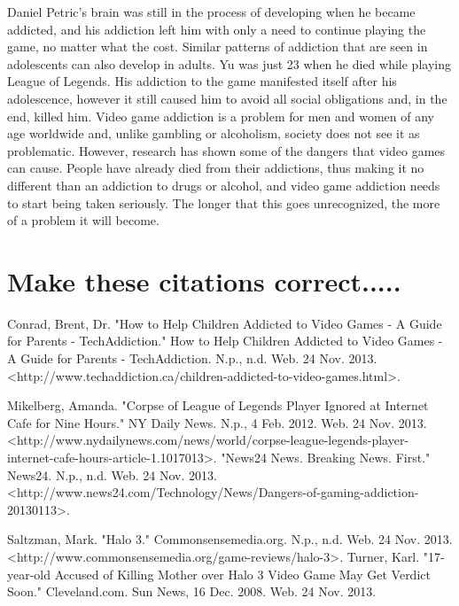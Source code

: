 \documentclass[a4paper,man,natbib]{apa6}
\renewcommand{\paragraph}{}
\begin{document}
\paragraph{}
Daniel Petric’s brain was still in the process of developing when he became addicted, and his addiction left him with only a need to continue playing the game, no matter what the cost. Similar patterns of addiction that are seen in adolescents can also develop in adults. Yu was just 23 when he died while playing League of Legends. His addiction to the game manifested itself after his adolescence, however it still caused him to avoid all social obligations and, in the end, killed him.	
\paragraph{}
Video game addiction is a problem for men and women of any age worldwide and, unlike gambling or alcoholism, society does not see it as problematic. However, research has shown some of the dangers that video games can cause. People have already died from their addictions, thus making it no different than an addiction to drugs or alcohol, and video game addiction needs to start being taken seriously. The longer that this goes unrecognized, the more of a problem it will become.

\section{Make these citations correct.....}
\paragraph{}
Conrad, Brent, Dr. "How to Help Children Addicted to Video Games - A Guide for Parents - TechAddiction." How to Help Children Addicted to Video Games - A Guide for Parents - TechAddiction. N.p., n.d. Web. 24 Nov. 2013. <http://www.techaddiction.ca/children-addicted-to-video-games.html>.

Mikelberg, Amanda. "Corpse of League of Legends Player Ignored at Internet Cafe for Nine Hours." NY Daily News. N.p., 4 Feb. 2012. Web. 24 Nov. 2013. <http://www.nydailynews.com/news/world/corpse-league-legends-player-internet-cafe-hours-article-1.1017013>.
"News24 News. Breaking News. First." News24. N.p., n.d. Web. 24 Nov. 2013. <http://www.news24.com/Technology/News/Dangers-of-gaming-addiction-20130113>.

Saltzman, Mark. "Halo 3." Commonsensemedia.org. N.p., n.d. Web. 24 Nov. 2013. <http://www.commonsensemedia.org/game-reviews/halo-3>.
Turner, Karl. "17-year-old Accused of Killing Mother over Halo 3 Video Game May Get Verdict Soon." Cleveland.com. Sun News, 16 Dec. 2008. Web. 24 Nov. 2013. %
\end{document}
